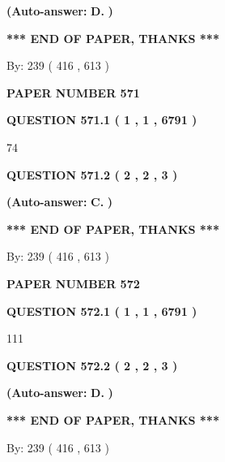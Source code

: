 \documentclass{ctexart}
\begin{document}
 
{\textbf{(Auto-answer:}}
{\textbf{\large{
D.}}}
{\textbf{)}}
 
 
   
   
   
   
\vspace{1.0in} 
{\textbf{\large{ *** END OF PAPER, THANKS *** }}} 
   
   
\hspace{1.0in} By: 
 239 ( 416 ,  613 )
   
   
   
   
\newpage 
\setcounter{page}{ 
   571001 } 
   
   
 {\textbf{ \Large{ PAPER NUMBER  571  }}}
   
   
   
   
  
  
{\textbf{\large{QUESTION
571.1 
 ( 1 , 1 , 6791 )
}}}

74
  
  
{\textbf{\large{QUESTION
571.2 
 ( 2 , 2 , 3 )
}}}
 
 
{\textbf{(Auto-answer:}}
{\textbf{\large{
C.}}}
{\textbf{)}}
 
 
   
   
   
   
\vspace{1.0in} 
{\textbf{\large{ *** END OF PAPER, THANKS *** }}} 
   
   
\hspace{1.0in} By: 
 239 ( 416 ,  613 )
   
   
   
   
\newpage 
\setcounter{page}{ 
   572001 } 
   
   
 {\textbf{ \Large{ PAPER NUMBER  572  }}}
   
   
   
   
  
  
{\textbf{\large{QUESTION
572.1 
 ( 1 , 1 , 6791 )
}}}

111
  
  
{\textbf{\large{QUESTION
572.2 
 ( 2 , 2 , 3 )
}}}
 
 
{\textbf{(Auto-answer:}}
{\textbf{\large{
D.}}}
{\textbf{)}}
 
 
   
   
   
   
\vspace{1.0in} 
{\textbf{\large{ *** END OF PAPER, THANKS *** }}} 
   
   
\hspace{1.0in} By: 
 239 ( 416 ,  613 )
   
   
   
\end{document}
